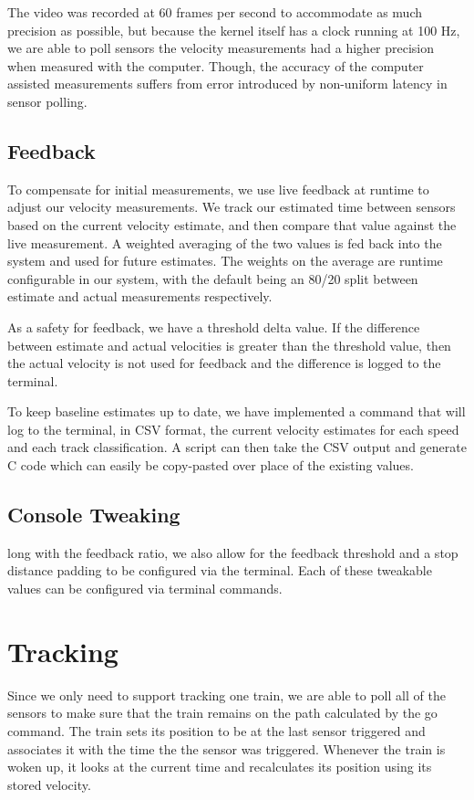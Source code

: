 \documentclass[pdftex,10pt,a4paper]{article}
\begin{document}
The video was recorded at 60 frames per second to accommodate as much
precision as possible, but because the kernel itself has a clock
running at 100 Hz, we are able to poll sensors the velocity
measurements had a higher precision when measured with the
computer. Though, the accuracy of the computer assisted measurements
suffers from error introduced by non-uniform latency in sensor polling.

\subsection*{Feedback}

To compensate for initial measurements, we use live feedback at runtime
to adjust our velocity measurements. We track our estimated time
between sensors based on the current velocity estimate, and then
compare that value against the live measurement. A weighted averaging of
the two values is fed back into the system and used for future estimates.
The weights on the average are runtime configurable in our system, with
the default being an 80/20 split between estimate and actual measurements
respectively.

As a safety for feedback, we have a threshold delta value. If the
difference between estimate and actual velocities is greater than the
threshold value, then the actual velocity is not used for feedback and
the difference is logged to the terminal.

To keep baseline estimates up to date, we have implemented a 
command that will log to the terminal, in CSV format, the current
velocity estimates for each speed and each track classification. A script
can then take the CSV output and generate C code which can easily be
copy-pasted over place of the existing values.

\subsection*{Console Tweaking}

long with the feedback ratio, we also allow for the feedback threshold
and a stop distance padding to be configured via the terminal. Each of
these tweakable values can be configured via terminal commands.

\section*{Tracking}

Since we only need to support tracking one train, we are able to poll
all of the sensors to make sure that the train remains on the path
calculated by the go command. The train sets its position to be at the
last sensor triggered and associates it with the time the the sensor was
triggered. Whenever the train is woken up, it looks at the
current time and recalculates its position using its stored velocity.
\end{document}
